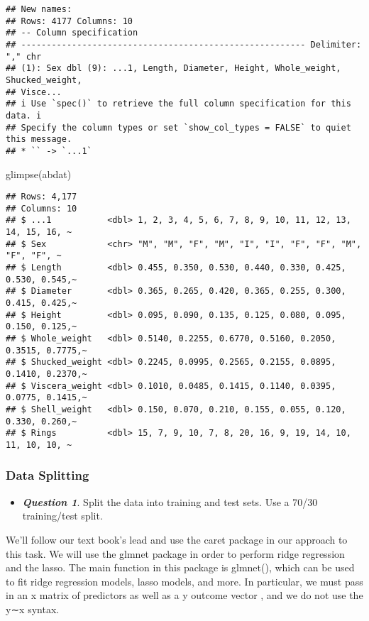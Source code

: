 \documentclass[
]{article}
\newenvironment{Shaded}{\begin{snugshade}}{\end{snugshade}}
\newcommand{\FunctionTok}[1]{\textcolor[rgb]{0.00,0.00,0.00}{#1}}
\newcommand{\NormalTok}[1]{#1}
\providecommand{\tightlist}{%
  \setlength{\itemsep}{0pt}\setlength{\parskip}{0pt}}
\begin{document}
\begin{verbatim}
## New names:
## Rows: 4177 Columns: 10
## -- Column specification
## -------------------------------------------------------- Delimiter: "," chr
## (1): Sex dbl (9): ...1, Length, Diameter, Height, Whole_weight, Shucked_weight,
## Visce...
## i Use `spec()` to retrieve the full column specification for this data. i
## Specify the column types or set `show_col_types = FALSE` to quiet this message.
## * `` -> `...1`
\end{verbatim}

\begin{Shaded}
\begin{Highlighting}[]
\FunctionTok{glimpse}\NormalTok{(abdat)}
\end{Highlighting}
\end{Shaded}

\begin{verbatim}
## Rows: 4,177
## Columns: 10
## $ ...1           <dbl> 1, 2, 3, 4, 5, 6, 7, 8, 9, 10, 11, 12, 13, 14, 15, 16, ~
## $ Sex            <chr> "M", "M", "F", "M", "I", "I", "F", "F", "M", "F", "F", ~
## $ Length         <dbl> 0.455, 0.350, 0.530, 0.440, 0.330, 0.425, 0.530, 0.545,~
## $ Diameter       <dbl> 0.365, 0.265, 0.420, 0.365, 0.255, 0.300, 0.415, 0.425,~
## $ Height         <dbl> 0.095, 0.090, 0.135, 0.125, 0.080, 0.095, 0.150, 0.125,~
## $ Whole_weight   <dbl> 0.5140, 0.2255, 0.6770, 0.5160, 0.2050, 0.3515, 0.7775,~
## $ Shucked_weight <dbl> 0.2245, 0.0995, 0.2565, 0.2155, 0.0895, 0.1410, 0.2370,~
## $ Viscera_weight <dbl> 0.1010, 0.0485, 0.1415, 0.1140, 0.0395, 0.0775, 0.1415,~
## $ Shell_weight   <dbl> 0.150, 0.070, 0.210, 0.155, 0.055, 0.120, 0.330, 0.260,~
## $ Rings          <dbl> 15, 7, 9, 10, 7, 8, 20, 16, 9, 19, 14, 10, 11, 10, 10, ~
\end{verbatim}

\hypertarget{data-splitting}{%
\subsubsection{Data Splitting}\label{data-splitting}}

\begin{itemize}
\tightlist
\item
  \textbf{\emph{Question 1}}. Split the data into training and test
  sets. Use a 70/30 training/test split.
\end{itemize}

We'll follow our text book's lead and use the caret package in our
approach to this task. We will use the glmnet package in order to
perform ridge regression and the lasso. The main function in this
package is glmnet(), which can be used to fit ridge regression models,
lasso models, and more. In particular, we must pass in an x matrix of
predictors as well as a y outcome vector , and we do not use the y∼x
syntax.
\end{document}
